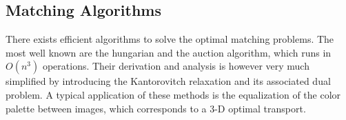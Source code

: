 \subsection{Matching Algorithms}

There exists efficient algorithms to solve the optimal matching problems. The most well known are the hungarian and the auction algorithm, which runs in $O(n^3)$ operations. Their derivation and analysis is however very much simplified by introducing the Kantorovitch relaxation and its associated dual problem.
%
A typical application of these methods is the equalization of the color palette between images, which corresponds to a 3-D optimal transport. 

  
  
  